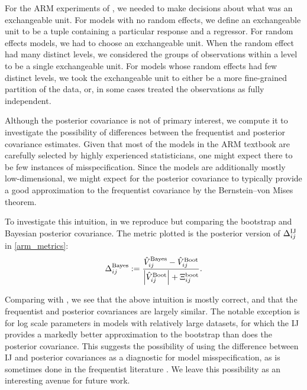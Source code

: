 
\ARMTable{}


For the ARM experiments of , we needed to
make decisions about what was an exchangeable unit. For models with no random
effects, we define an exchangeable unit to be a tuple containing a particular
response and a regressor.  For random effects models, we had to choose an
exchangeable unit. When the random effect had many distinct levels, we
considered the groups of observations within a level to be a single exchangeable
unit.  For models whose random effects had few distinct levels, we took the
exchangeable unit to either be a more fine-grained partition of the data, or, in
some cases treated the observations as fully independent.

Although the posterior covariance is not of primary
interest, we compute it to investigate the possibility of differences between
the frequentist and posterior covariance estimates.
%
Given that most of the models in the ARM textbook are carefully selected by
highly experienced statisticians, one might expect there to be few instances of
misspecification.  Since the models are additionally mostly low-dimensional, we
might expect for the posterior covariance to typically provide a good
approximation to the frequentist covariance by the Bernstein--von Mises theorem.

To investigate this intuition, in  we reproduce
 but comparing the bootstrap and Bayesian posterior
covariance.  The metric plotted is the posterior version of
$\Delta^{\mathrm{IJ}}_{ij}$ in \eqref{arm_metrics}:
$$
\Delta^{\mathrm{Bayes}}_{ij} :=
  \frac{\hat{V}^{\mathrm{Bayes}}_{ij} - \hat{V}^{\mathrm{Boot}}_{ij}}
  {\left| \hat{V}^{\mathrm{Boot}}_{ij} \right| + \Xi^{\textrm{boot}}_{ij}}.
$$

\ARMGraphPostDiff{}

Comparing with , we see that the above intuition is mostly
correct, and that the frequentist and posterior covariances are largely similar.
The notable exception is for log scale parameters in models with relatively
large datasets, for which the IJ provides a markedly better approximation to the
bootstrap than does the posterior covariance.  This suggests the possibility of
using the difference between IJ and posterior covariances as a diagnostic for
model misspecification, as is sometimes done in the frequentist literature
\citep{white:1982:maximum}.  We leave this possibility as an interesting avenue
for future work.